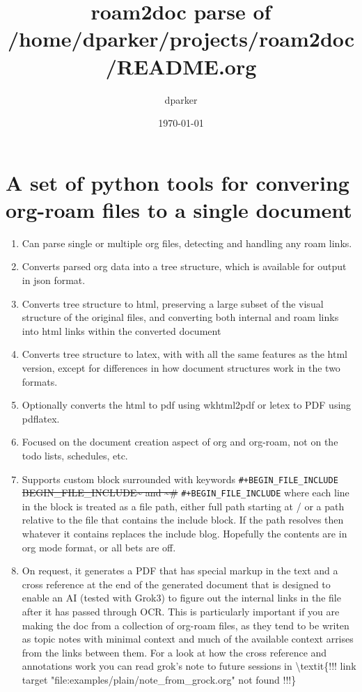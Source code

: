 \documentclass[11pt]{article}
\author{dparker}
\date{\today}
\title{roam2doc parse of /home/dparker/projects/roam2doc/README.org}
\begin{document}
\maketitle
\tableofcontents
\clearpage
\section{A set of python tools for convering org-roam files to a single document  }
 \label{obj-3}
 \label{obj-2}
\begin{enumerate}
\item
Can parse single or multiple org files, detecting and handling any roam links.
\item
Converts parsed org data into a tree structure, which is available for output in json format.
\item
Converts tree structure to html, preserving a large subset of the visual structure of
   the original files, and converting both internal and roam links into html links within
   the converted document

\item
Converts tree structure to latex, with with all the same features as the html version, except
   for differences in how document structures work in the two formats.

\item
Optionally converts the html to pdf using wkhtml2pdf or letex to PDF using pdflatex.
\item
Focused on the document creation aspect of org and org-roam, not on the todo lists, schedules, etc.
\item
Supports custom block surrounded with keywords
\texttt{\#+BEGIN\_FILE\_INCLUDE}
\sout{BEGIN\_FILE\_INCLUDE\textasciitilde{} and \textasciitilde{}\#}
\texttt{\#+BEGIN\_FILE\_INCLUDE}
  where each line in the block is treated as a file path, either full path starting at / or a path
  relative to the file that contains the include block. If the path resolves then whatever it
  contains replaces the include blog. Hopefully the contents are in org mode format, or all bets are off.

\item
On request, it generates a PDF that has special markup in the text and a cross reference at the end
  of the generated document that is designed to enable an AI (tested with Grok3) to figure out the
  internal links in the file after it has passed through OCR. This is particularly important if you
  are making the doc from a collection of org-roam files, as they tend to be writen as topic notes
  with minimal context and much of the available context arrises from the links between them. 
  For a look at how the cross reference and annotations work you can read grok's note to future
sessions in
\textbackslash{}textit\{!!! link target "file:examples/plain/note\_from\_grock.org" not found !!!\}
\vspace{\baselineskip}

\end{enumerate}
\end{document}
